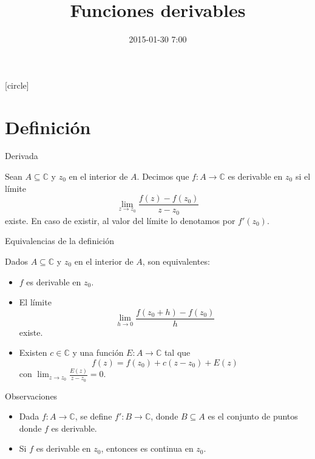 \documentclass[spanish,presentation]{beamer}
\date{2015-01-30 7:00}
\title{Funciones derivables}
\begin{document}
\maketitle
{}
[circle]

\tableofcontents

\section{Definición}
\label{sec-1}

\begin{frame}[label=sec-1-1]{Derivada}
\begin{definition}
Sean \(A\subseteq \mathbb{C}\) y \(z_{0}\) en el interior de
\(A\). Decimos que \(f\colon A\to \mathbb{C}\) es \alert{derivable en
\(z_{0}\)} si el límite
\begin{displaymath}
\lim_{z\to z_{0}}\frac{f(z)-f(z_{0})}{z-z_{0}}
\end{displaymath}
existe. En caso de existir, al valor del límite lo denotamos por
\(f'(z_{0})\). 
\end{definition}
\end{frame}

\begin{frame}[label=sec-1-2]{Equivalencias de la definición}
\begin{theorem}
Dados \(A\subseteq \mathbb{C}\) y \(z_{0}\) en el interior de
\(A\), son equivalentes:

\begin{itemize}
\item \(f\) es derivable en \(z_{0}\).
\item El límite 
\begin{displaymath}
\lim_{h\to 0}\frac{f(z_{0}+h)-f(z_{0})}{h}
\end{displaymath}
existe.
\item Existen \(c\in \mathbb{C}\) y una función \(E\colon A\to
      \mathbb{C}\) tal que
\begin{displaymath}
f(z)=f(z_{0})+c(z-z_{0})+E(z)
\end{displaymath}
con \(\lim_{z\to z_{0}}\frac{E(z)}{z-z_{0}}=0\).
\end{itemize}
\end{theorem}
\end{frame}

\begin{frame}[label=sec-1-3]{Observaciones}
\begin{itemize}
\item Dada \(f\colon A\to \mathbb{C}\), se define \(f'\colon B\to
     \mathbb{C}\), donde \(B\subseteq A\) es el conjunto de puntos
donde \(f\) es derivable.
\item Si \(f\) es derivable en \(z_{0}\), entonces es continua en \(z_{0}\).
\end{itemize}
\end{frame}
\end{document}
